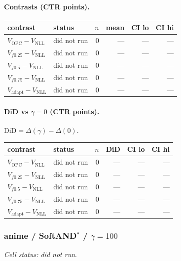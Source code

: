 \documentclass[10pt,a4paper]{article}
\begin{document}
\paragraph{Contrasts (CTR points).}
{\centering\small\begin{tabular}{llrrrr}
\toprule contrast & status & $n$ & mean & CI lo & CI hi \\
\midrule
$V_{\mathrm{OPC}}-V_{\mathrm{NLL}}$ & did not run & 0 & --- & --- & --- \\
$V_{f0.25}-V_{\mathrm{NLL}}$ & did not run & 0 & --- & --- & --- \\
$V_{f0.5}-V_{\mathrm{NLL}}$ & did not run & 0 & --- & --- & --- \\
$V_{f0.75}-V_{\mathrm{NLL}}$ & did not run & 0 & --- & --- & --- \\
$V_{\mathrm{adapt}}-V_{\mathrm{NLL}}$ & did not run & 0 & --- & --- & --- \\
\bottomrule\end{tabular}\par}
\paragraph{DiD vs $\gamma=0$ (CTR points).} $\mathrm{DiD}=\Delta(\gamma)-\Delta(0)$.
{\centering\small\begin{tabular}{llrrrr}
\toprule contrast & status & $n$ & DiD & CI lo & CI hi \\
\midrule
$V_{\mathrm{OPC}}-V_{\mathrm{NLL}}$ & did not run & 0 & --- & --- & --- \\
$V_{f0.25}-V_{\mathrm{NLL}}$ & did not run & 0 & --- & --- & --- \\
$V_{f0.5}-V_{\mathrm{NLL}}$ & did not run & 0 & --- & --- & --- \\
$V_{f0.75}-V_{\mathrm{NLL}}$ & did not run & 0 & --- & --- & --- \\
$V_{\mathrm{adapt}}-V_{\mathrm{NLL}}$ & did not run & 0 & --- & --- & --- \\
\bottomrule\end{tabular}\par}
\bigskip
\subsubsection{anime / SoftAND$^*$ / $\gamma=100$}
\emph{Cell status: did not run}.
\end{document}
